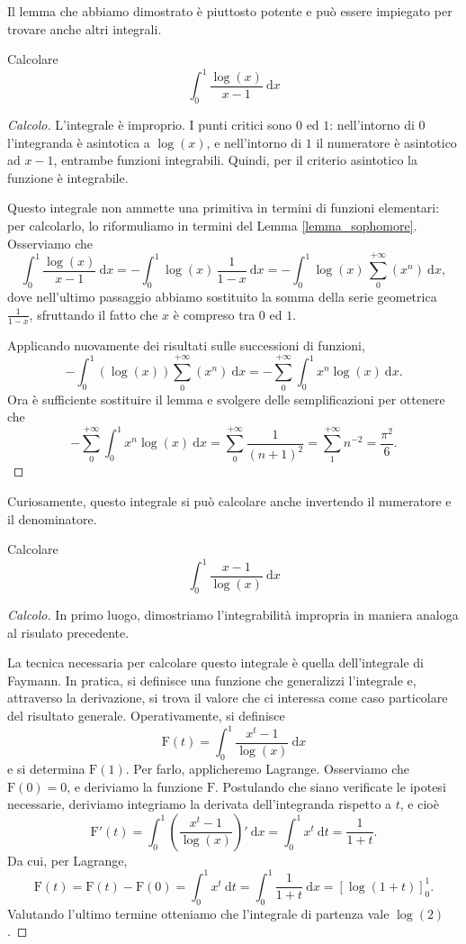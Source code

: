 Il lemma che abbiamo dimostrato è piuttosto potente e può essere impiegato per trovare anche altri integrali.
\begin{Res} Calcolare
	\[
		\int^1_0\frac{\log(x)}{x-1}\:\mathrm{d}x
	\]
\end{Res}
\begin{proof}[Calcolo]
	L'integrale è improprio. I punti critici sono $0$ ed $1$: nell'intorno di $0$ l'integranda è asintotica a $\log(x)$, e nell'intorno di $1$ il numeratore è asintotico ad $x-1$, entrambe funzioni integrabili. Quindi, per il criterio asintotico la funzione è integrabile.

	Questo integrale non ammette una primitiva in termini di funzioni elementari: per calcolarlo, lo riformuliamo in termini del Lemma \ref{lemma_sophomore}. Osserviamo che
	\[
		\int^1_0\frac{\log(x)}{x-1}\:\mathrm{d}x=-\int^1_0\log(x)\,\frac{1}{1-x}\:\mathrm{d}x=-\int^1_0\log(x)\,\sum^{+\infty}_0(x^n)\:\mathrm{d}x,
	\]
	dove nell'ultimo passaggio abbiamo sostituito la somma della serie geometrica $\frac{1}{1-x}$, sfruttando il fatto che $x$ è compreso tra $0$ ed $1$.

	Applicando nuovamente dei risultati sulle successioni di funzioni,
	\[
		-\int^1_0\left(\log(x)\right)\sum^{+\infty}_0(x^n)\:\mathrm{d}x=-\sum^{+\infty}_0\int^1_0x^n\log(x)\:\mathrm{d}x.
	\]
	Ora è sufficiente sostituire il lemma e svolgere delle semplificazioni per ottenere che
	\[
		-\sum^{+\infty}_0\int^1_0x^n\log(x)\:\mathrm{d}x=\sum^{+\infty}_{0}\frac{1}{(n+1)^2}=\sum^{+\infty}_{1}n^{-2}=\frac{\pi^2}{6}.
	\]
\end{proof}

Curiosamente, questo integrale si può calcolare anche invertendo il numeratore e il denominatore.

\begin{Res} Calcolare
	\[
		\int^1_0\frac{x-1}{\log(x)}\:\mathrm{d}x
	\]
\end{Res}
\begin{proof}[Calcolo]
	In primo luogo, dimostriamo l'integrabilità impropria in maniera analoga al risulato precedente.

	La tecnica necessaria per calcolare questo integrale è quella dell'integrale di Faymann. In pratica, si definisce una funzione che generalizzi l'integrale e, attraverso la derivazione, si trova il valore che ci interessa come caso particolare del risultato generale. Operativamente, si definisce
	\[
		\mathrm{F}(t)=\int^1_0\frac{x^t-1}{\log(x)}\:\mathrm{d}x
	\]
	e si determina $\mathrm{F}(1)$. Per farlo, applicheremo Lagrange. Osserviamo che $\mathrm{F}(0)=0$, e deriviamo la funzione $\mathrm{F}$. Postulando che siano verificate le ipotesi necessarie, deriviamo integriamo la derivata dell'integranda rispetto a $t$, e cioè
	\[
		\mathrm{F}'(t)=\int^1_0\left(\frac{x^t-1}{\log(x)}\right)'\:\mathrm{d}x=\int^1_0x^t\:\mathrm{d}t=\frac{1}{1+t}.
	\]
	Da cui, per Lagrange,
	\[
		\mathrm{F}(t)=\mathrm{F}(t)-\mathrm{F}(0)=\int^1_0x^t\:\mathrm{d}t=\int^1_0\frac{1}{1+t}\:\mathrm{d}x=\left[\log(1+t)\right]^1_0.
	\]
	Valutando l'ultimo termine otteniamo che l'integrale di partenza vale $\log(2)$.
\end{proof}